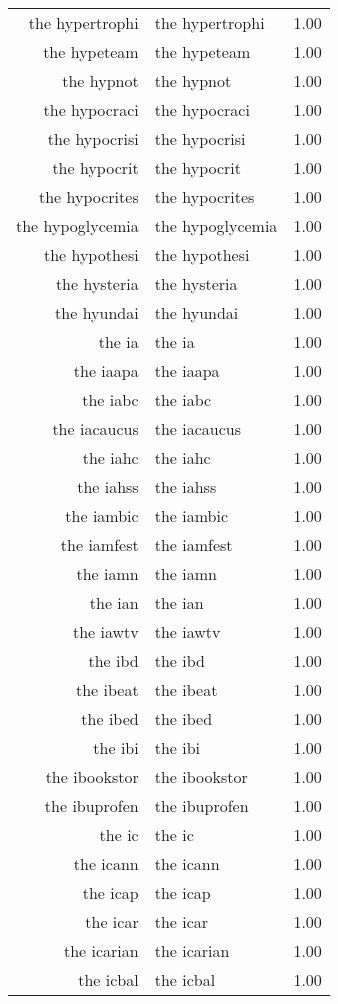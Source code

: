 \begin{table}[ht]
\begin{tabular}{rlr}
  the hypertrophi & the hypertrophi & 1.00 \\ 
  the hypeteam & the hypeteam & 1.00 \\ 
  the hypnot & the hypnot & 1.00 \\ 
  the hypocraci & the hypocraci & 1.00 \\ 
  the hypocrisi & the hypocrisi & 1.00 \\ 
  the hypocrit & the hypocrit & 1.00 \\ 
  the hypocrites & the hypocrites & 1.00 \\ 
  the hypoglycemia & the hypoglycemia & 1.00 \\ 
  the hypothesi & the hypothesi & 1.00 \\ 
  the hysteria & the hysteria & 1.00 \\ 
  the hyundai & the hyundai & 1.00 \\ 
  the ia & the ia & 1.00 \\ 
  the iaapa & the iaapa & 1.00 \\ 
  the iabc & the iabc & 1.00 \\ 
  the iacaucus & the iacaucus & 1.00 \\ 
  the iahc & the iahc & 1.00 \\ 
  the iahss & the iahss & 1.00 \\ 
  the iambic & the iambic & 1.00 \\ 
  the iamfest & the iamfest & 1.00 \\ 
  the iamn & the iamn & 1.00 \\ 
  the ian & the ian & 1.00 \\ 
  the iawtv & the iawtv & 1.00 \\ 
  the ibd & the ibd & 1.00 \\ 
  the ibeat & the ibeat & 1.00 \\ 
  the ibed & the ibed & 1.00 \\ 
  the ibi & the ibi & 1.00 \\ 
  the ibookstor & the ibookstor & 1.00 \\ 
  the ibuprofen & the ibuprofen & 1.00 \\ 
  the ic & the ic & 1.00 \\ 
  the icann & the icann & 1.00 \\ 
  the icap & the icap & 1.00 \\ 
  the icar & the icar & 1.00 \\ 
  the icarian & the icarian & 1.00 \\ 
  the icbal & the icbal & 1.00 \\ 

\end{tabular}
\end{table}
